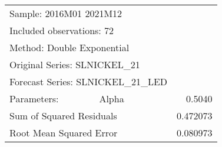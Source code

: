 \begin{tabular}{lrrrr}
\toprule
\multicolumn{3}{l}{Sample: 2016M01 2021M12}&\multicolumn{1}{c}{}&\multicolumn{1}{c}{}\\
\multicolumn{3}{l}{Included observations: 72}&\multicolumn{1}{c}{}&\multicolumn{1}{c}{}\\
\multicolumn{3}{l}{Method: Double Exponential}&\multicolumn{1}{c}{}&\multicolumn{1}{c}{}\\
\multicolumn{3}{l}{Original Series: SLNICKEL\_21}&\multicolumn{1}{c}{}&\multicolumn{1}{c}{}\\
\multicolumn{4}{l}{Forecast Series: SLNICKEL\_21\_LED}&\multicolumn{1}{c}{}\\
\midrule
\multicolumn{1}{l}{Parameters:}&\multicolumn{1}{l}{Alpha}&\multicolumn{1}{c}{}&\multicolumn{1}{c}{}&\multicolumn{1}{r}{0.5040}\\
\multicolumn{3}{l}{Sum of Squared Residuals}&\multicolumn{1}{c}{}&\multicolumn{1}{r}{0.472073}\\
\multicolumn{3}{l}{Root Mean Squared Error}&\multicolumn{1}{c}{}&\multicolumn{1}{r}{0.080973}\\
\bottomrule
\end{tabular}

